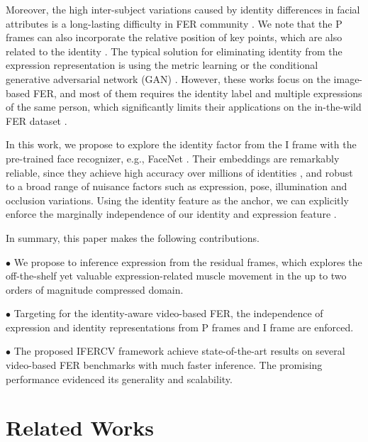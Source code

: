 \documentclass[a4paper,conference]{IEEEtran}
\begin{document}
Moreover, the high inter-subject variations caused by identity differences in facial attributes is a long-lasting difficulty in FER community \cite{liu2017adaptive,liu2018normalized}. We note that the P frames can also incorporate the relative position of key points, which are also related to the identity \cite{tian2011facial}. The typical solution for eliminating identity from the expression representation is using the metric learning \cite{meng2017identity,liu2017adaptive} or the conditional generative adversarial network (GAN) \cite{ali2019all}. However, these works focus on the image-based FER, and most of them requires the identity label and multiple expressions of the same person, which significantly limits their applications on the in-the-wild FER dataset \cite{dhall2014emotion}. 


In this work, we propose to explore the identity factor from the I frame with the pre-trained face recognizer, e.g., FaceNet \cite{schroff2015facenet}. Their embeddings are remarkably reliable, since they achieve high accuracy over millions of identities \cite{kemelmacher2016megaface}, and robust to a broad range of nuisance factors such as expression, pose, illumination and occlusion variations. Using the identity feature as the anchor, we can explicitly enforce the marginally independence of our identity and expression feature \cite{liu2019feature}. 


In summary, this paper makes the following contributions.


\noindent $\bullet$ We propose to inference expression from the residual frames, which explores the off-the-shelf yet valuable expression-related muscle movement in the up to two orders of magnitude compressed domain.

\noindent $\bullet$ Targeting for the identity-aware video-based FER, the independence of expression and identity representations from P frames and I frame are enforced.


\noindent $\bullet$ The proposed IFERCV framework achieve state-of-the-art results on several video-based FER benchmarks with much faster inference. The promising performance evidenced its generality and scalability.




\section{Related Works}
\end{document}

